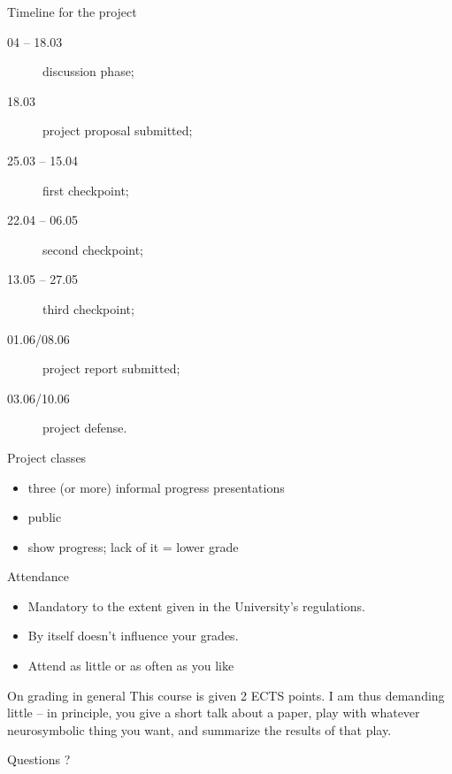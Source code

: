 \documentclass{lecture}
\begin{document}
\begin{frame}{Timeline for the project}
    \begin{description}
        \item[04 -- 18.03] discussion phase;
        \item[18.03] project proposal submitted;
        \item[25.03 -- 15.04] first checkpoint;
        \item[22.04 -- 06.05] second checkpoint; 
        \item[13.05 -- 27.05] third checkpoint;
        \item[01.06/08.06] project report submitted;
        \item[03.06/10.06] project defense.
    \end{description}
\end{frame}

\begin{frame}{Project classes}
    \begin{itemize}
        \item three (or more) informal progress presentations
        \item public
        \item show progress; lack of it = lower grade                        
    \end{itemize}    
\end{frame}

\begin{frame}{Attendance}
    \begin{itemize}
        \item Mandatory to the extent given in the University's regulations.
        \item By itself doesn't influence your grades.
        \item Attend as little or as often as you like
    \end{itemize}
\end{frame}

\begin{frame}{On grading in general}
    This course is given 2 ECTS points. I am thus demanding little -- in principle, you give a short talk about a paper, play with whatever neurosymbolic thing you want, and summarize the results of that play.
%
\end{frame}

\begin{frame}{Questions}
    \centering \Huge \alert{?}
\end{frame}
\end{document}
